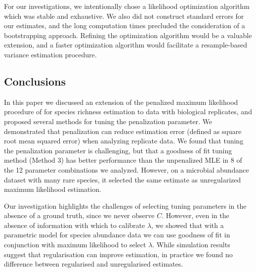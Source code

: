 \documentclass[12pt]{article}
\newcommand{\lambdagrid}{\lambda^{\text{grid}}}
\theoremstyle{break}
\theoremstyle{break}
\begin{document}
For our investigations, we intentionally chose a likelihood optimization algorithm which was stable and exhaustive. We also did not construct standard errors for our estimates, and the long computation times precluded the consideration of a bootstrapping approach. Refining the optimization algorithm would be a valuable extension, and a faster optimization algorithm would facilitate a resample-based variance estimation procedure.

\subsection{Conclusions}

In this paper we discussed an extension of the penalized maximum likelihood procedure of \citet{wang_2005} for species richness estimation to data with biological replicates, and proposed several methods for tuning the penalization parameter.  We demonstrated that penalization can reduce estimation error (defined as square root mean squared error) when analyzing replicate data.
We found that tuning the penalization parameter is challenging, but that a goodness of fit tuning method (Method 3) has better performance than the unpenalized MLE in 8 of the 12 parameter combinations we analyzed. However, on a microbial abundance dataset with many rare species, it selected the same estimate as unregularized maximum likelihood estimation.

Our investigation highlights the challenges of selecting tuning parameters in the absence of a ground truth, since we never observe $C$. However, even in the absence of information with which to calibrate $\lambda$, we showed that
with a parametric model for species abundance data we can use goodness of fit in conjunction with maximum likelihood to select $\lambda$.
While simulation results suggest that regularisation can improve estimation, in practice we found no difference between regularised and unregularised estimates.


\end{document}
